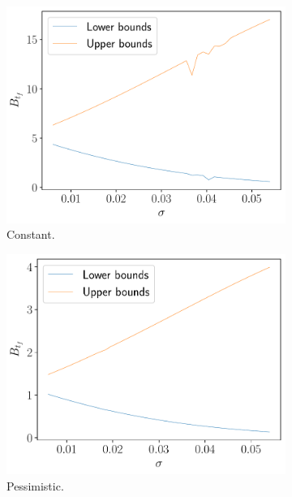 \documentclass[11pt]{article}
\theoremstyle{definition}
\theoremstyle{remark}
\theoremstyle{remark}
\begin{document}
\begin{figure}
  \centering
  \begin{subfigure}[b]{0.45\textwidth}
      \centering
      \includegraphics[scale=0.45]{sens_constant.pdf}
      \caption{Constant.}
  \end{subfigure}
  \begin{subfigure}[b]{0.45\textwidth}
      \centering
      \includegraphics[scale=0.45]{sens_pessimistic.pdf}
      \caption{Pessimistic.}
  \end{subfigure}
  \begin{subfigure}[b]{0.45\textwidth}
      \centering

\end{subfigure}
\end{figure}
\end{document}

